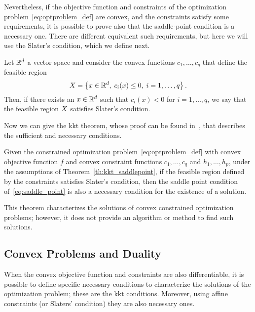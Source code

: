 Nevertheless, if the objective function and constraints of the optimization problem~\eqref{eq:optproblem_def} are convex, and the constraints satisfy some requirements, it is possible to prove also that the saddle-point condition is a necessary one.
There are different equivalent such requirements, but here we will use the Slater's condition, which we define next.
\begin{definition}
    Let $\mathbb{R}^d$ a vector space and consider the convex functions $c_1, \ldots, c_q$ that define the feasible region
    \begin{equation}
        X = \left\{x \in \mathbb{R}^d, \; c_i(x) \leq 0, \; i=1, \ldots, q\right\} .
    \end{equation}  
    Then, if there exists an $x \in \mathbb{R}^d$ such that $c_i(x) < 0$ for $i=1, \ldots, q$, we say that the feasible region $X$ satisfies Slater's condition.       
\end{definition}
Now we can give the \acrshort{kkt} theorem, whose proof can be found in~\citet{ScholkopfS02}, that describes the sufficient and necessary conditions.
\begin{theorem}
    Given the constrained optimization problem~\eqref{eq:optproblem_def} with convex objective function $f$ and convex constraint functions $c_1, \ldots, c_q$ and $h_1, \ldots, h_p$, 
    under the assumptions of Theorem~\ref{th:kkt_saddlepoint}, if the feasible region defined by the constraints satisfies Slater's condition, then the saddle point condition of~\eqref{eq:saddle_point} is also a necessary condition for the existence of a solution.
\end{theorem}
This theorem characterizes the solutions of convex constrained optimization problems; however, it does not provide an algorithm or method to find such solutions.

\subsection{Convex Problems and Duality}
When the convex objective function and constraints are also differentiable, it is possible to define specific necessary conditions to characterize the solutions of the optimization problem; these are the \acrshort{kkt} conditions. Moreover, using affine constraints (or Slaters' condition) they are also necessary ones.

